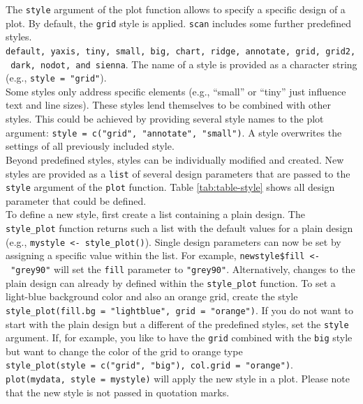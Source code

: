 \documentclass[
]{book}
\begin{document}
The \texttt{style} argument of the plot function allows to specify a specific design of a plot. By default, the \texttt{grid} style is applied. \texttt{scan} includes some further predefined styles. \texttt{default,\ yaxis,\ tiny,\ small,\ big,\ chart,\ ridge,\ annotate,\ grid,\ grid2,\ dark,\ nodot,\ and\ sienna}. The name of a style is provided as a character string (e.g., \texttt{style\ =\ "grid"}).\\
Some styles only address specific elements (e.g., ``small'' or ``tiny'' just influence text and line sizes). These styles lend themselves to be combined with other styles. This could be achieved by providing several style names to the plot argument: \texttt{style\ =\ c("grid",\ "annotate",\ "small")}. A style overwrites the settings of all previously included style.\\
Beyond predefined styles, styles can be individually modified and created. New styles are provided as a \texttt{list} of several design parameters that are passed to the \texttt{style} argument of the \texttt{plot} function. Table \ref{tab:table-style} shows all design parameter that could be defined.\\
To define a new style, first create a list containing a plain design. The \texttt{style\_plot} function returns such a list with the default values for a plain design (e.g., \texttt{mystyle\ \textless{}-\ style\_plot()}). Single design parameters can now be set by assigning a specific value within the list. For example, \texttt{newstyle\$fill\ \textless{}-\ "grey90"} will set the \texttt{fill} parameter to \texttt{"grey90"}. Alternatively, changes to the plain design can already by defined within the \texttt{style\_plot} function. To set a light-blue background color and also an orange grid, create the style \texttt{style\_plot(fill.bg\ =\ "lightblue",\ grid\ =\ "orange")}.
If you do not want to start with the plain design but a different of the predefined styles, set the \texttt{style} argument. If, for example, you like to have the \texttt{grid} combined with the \texttt{big} style but want to change the color of the grid to orange type \texttt{style\_plot(style\ =\ c("grid",\ "big"),\ col.grid\ =\ "orange")}. \texttt{plot(mydata,\ style\ =\ mystyle)} will apply the new style in a plot. Please note that the new style is not passed in quotation marks.
\end{document}
